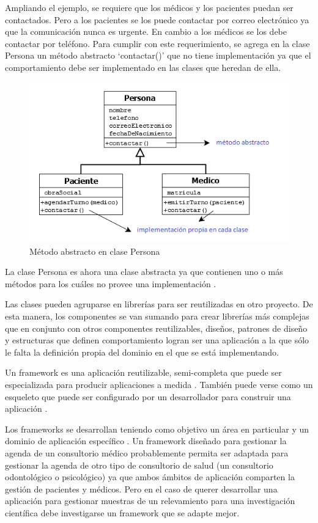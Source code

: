 	Ampliando el ejemplo, se requiere que los médicos y los pacientes puedan ser contactados.
Pero a los pacientes se los puede contactar por correo electrónico ya que la comunicación nunca es urgente. En cambio a los médicos se los debe contactar por teléfono. Para cumplir con este requerimiento, se agrega en la clase Persona un método abstracto ‘contactar()’ que no tiene implementación ya que el comportamiento debe ser implementado en las clases que heredan de ella. 

\begin{figure}[H]
		\centering
		\includegraphics[scale=0.4]{04-framework/personaMetodoAbstracto.png}
		\caption{Método abstracto en clase Persona}
		\label{fig:umlClassAttributesMethods}
	\end{figure}
	
La clase Persona es ahora una clase abstracta ya que contienen uno o más métodos para los cuáles no provee una implementación \cite{weisfeld2008object}. 
 
Las clases pueden agruparse en librerías para ser reutilizadas en otro proyecto. De esta manera, los componentes se van sumando para crear librerías más complejas que en conjunto con otros componentes reutilizables, diseños, patrones de diseño y estructuras que definen comportamiento logran ser una aplicación a la que sólo le falta la definición propia del dominio en el que se está implementando.
 
Un framework es una aplicación reutilizable, semi-completa que puede ser especializada para producir aplicaciones a medida \cite{fayad1997object}. También puede verse como un esqueleto que puede ser configurado por un desarrollador para construir una aplicación \cite{johnson1997frameworks}.   
 
Los frameworks se desarrollan teniendo como objetivo un área en particular y un dominio de aplicación específico \cite{fayad1997object}. Un framework diseñado para gestionar la agenda de un consultorio médico probablemente permita ser adaptada para gestionar la agenda de otro tipo de consultorio de salud (un consultorio odontológico o psicológico) ya que ambos ámbitos de aplicación comparten la gestión de pacientes y médicos. Pero en el caso de querer desarrollar una aplicación para gestionar muestras de un relevamiento para una investigación científica debe investigarse un framework que se adapte mejor.
		
